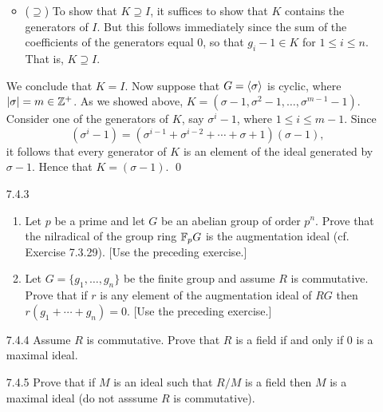 \begin{enumerate}
\begin{itemize}
         \item ($\supseteq$) To show that $K \supseteq I$, it suffices to show
               that $K$ contains the generators of $I$. But this follows
               immediately since the sum of the coefficients of the generators
               equal 0, so that $g_i - 1 \in K$ for $1 \le i \le n$. That is,
               $K \supseteq I$.
      \end{itemize}
      We conclude that $K = I$. Now suppose that $G = \langle \sigma \rangle$ is cyclic, 
      where $|\sigma| = m \in \mathbb{Z}^+$. As we showed above,
      $K = (\sigma - 1, \sigma^2 - 1, \ldots, \sigma^{m-1} - 1)$. Consider one
      of the generators of $K$, say $\sigma^i - 1$, where $1 \le i \le m - 1$.
      Since
      $$(\sigma^i - 1) = (\sigma^{i-1} + \sigma^{i-2} + \cdots + \sigma + 1)
        (\sigma - 1),$$
      it follows that every generator of $K$ is an element of the ideal
      generated by $\sigma - 1$. Hence that $K = (\sigma - 1)$. \qed
   \item[7.4.3]   \begin{enumerate}
                     \item Let $p$ be a prime and let $G$ be an abelian group of
                           order $p^n$. Prove that the nilradical of the group
                           ring $\mathbb{F}_pG$ is the augmentation ideal
                           (cf. Exercise 7.3.29). [Use the preceding exercise.]
                     \item Let $G = \{g_1, \ldots, g_n\}$ be the finite group
                           and assume $R$ is commutative. Prove that if $r$ is
                           any element of the augmentation ideal of $RG$ then
                           $r(g_1 + \cdots + g_n) = 0$. [Use the preceding
                           exercise.]
                  \end{enumerate}
   \item[7.4.4]   Assume $R$ is commutative. Prove that $R$ is a field if and
                  only if 0 is a maximal ideal.
   \item[7.4.5]   Prove that if $M$ is an ideal such that $R/M$ is a field then
                  $M$ is a maximal ideal (do not asssume $R$ is commutative).

\end{enumerate}

